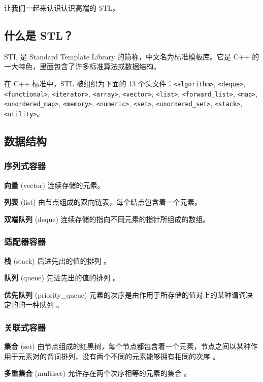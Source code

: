
让我们一起来认识认识高端的 STL。

\subsection{什么是 STL？}

STL 是 Standard Template Library 的简称，中文名为标准模板库。它是 C++ 的一大特色，里面包含了许多标准算法或数据结构。

在 C++ 标准中，STL 被组织为下面的 13 个头文件：\texttt{<algorithm>}, \texttt{<deque>}, \texttt{<functional>}, \texttt{<iterator>}, \texttt{<array>}, \texttt{<vector>}, \texttt{<list>}, \texttt{<forward\_list>}, \texttt{<map>}, \texttt{<unordered\_map>}, \texttt{<memory>}, \texttt{<numeric>}, \texttt{<set>}, \texttt{<unordered\_set>}, \texttt{<stack>}, \texttt{<utility>}。

\subsection{数据结构}

\subsubsection{序列式容器}

\textbf{向量} (vector) 连续存储的元素。

\textbf{列表} (list) 由节点组成的双向链表，每个结点包含着一个元素。

\textbf{双端队列} (deque) 连续存储的指向不同元素的指针所组成的数组。

\subsubsection{适配器容器}

\textbf{栈} (stack) 后进先出的值的排列 。

\textbf{队列} (queue) 先进先出的值的排列 。

\textbf{优先队列} (priority\_queue) 元素的次序是由作用于所存储的值对上的某种谓词决定的的一种队列 。

\subsubsection{关联式容器}

\textbf{集合} (set) 由节点组成的红黑树，每个节点都包含着一个元素，节点之间以某种作用于元素对的谓词排列，没有两个不同的元素能够拥有相同的次序 。

\textbf{多重集合} (multiset) 允许存在两个次序相等的元素的集合 。

